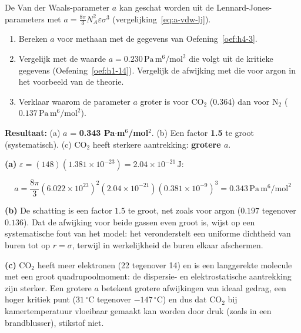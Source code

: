 \begin{oefening}
De Van der Waals-parameter \(a\) kan geschat worden uit de Lennard-Jones-parameters met \(a = \frac{8\pi}{3}N_A^2\varepsilon\sigma^3\) (vergelijking~\eqref{eq:a-vdw-lj}).

\begin{enumerate}
\item[(a)]
  Bereken \(a\) voor methaan met de gegevens van Oefening~\ref{oef:h4-3}.
\item[(b)]
  Vergelijk met de waarde \(a = 0.230\,\mathrm{Pa\,m^6/mol^2}\) die volgt uit de kritieke gegevens (Oefening~\ref{oef:h1-14}). Vergelijk de afwijking met die voor argon in het voorbeeld van de theorie.
\item[(c)]
  Verklaar waarom de parameter \(a\) groter is voor \(\mathrm{CO_2}\) (\(0.364\)) dan voor \(\mathrm{N_2}\) (\(0.137\,\mathrm{Pa\,m^6/mol^2}\)).
\end{enumerate}
\end{oefening}
\begin{oplossing}
\textbf{Resultaat:} (a) \(a\) = \textbf{0.343 Pa\ensuremath{\cdot{}}m\ensuremath{^{6}}/mol\ensuremath{^{2}}}. (b) Een factor \textbf{1.5} te groot (systematisch). (c) CO\ensuremath{_{2}} heeft sterkere aantrekking: \textbf{grotere \(a\)}.

\textbf{(a)} \(\varepsilon = (148)(1.381\times10^{-23}) = 2.04\times10^{-21}\,\mathrm{J}\):

\[
a = \frac{8\pi}{3}(6.022\times10^{23})^2(2.04\times10^{-21})(0.381\times10^{-9})^3 = 0.343\,\mathrm{Pa\,m^6/mol^2}
\]

\textbf{(b)} De schatting is een factor \(1.5\) te groot, net zoals voor argon (\(0.197\) tegenover \(0.136\)). Dat de afwijking voor beide gassen even groot is, wijst op een systematische fout van het model: het veronderstelt een uniforme dichtheid van buren tot op \(r = \sigma\), terwijl in werkelijkheid de buren elkaar afschermen.

\textbf{(c)} \(\mathrm{CO_2}\) heeft meer elektronen (22 tegenover 14) en is een langgerekte molecule met een groot quadrupoolmoment: de dispersie- en elektrostatische aantrekking zijn sterker. Een grotere \(a\) betekent grotere afwijkingen van ideaal gedrag, een hoger kritiek punt (\(31\,^\circ\mathrm{C}\) tegenover \(-147\,^\circ\mathrm{C}\)) en dus dat \(\mathrm{CO_2}\) bij kamertemperatuur vloeibaar gemaakt kan worden door druk (zoals in een brandblusser), stikstof niet.
\end{oplossing}

